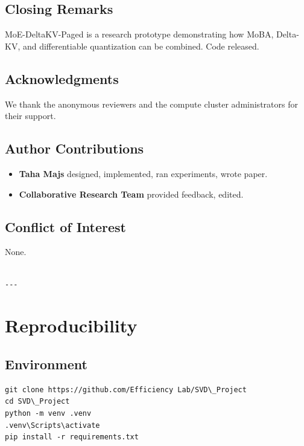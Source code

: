 \subsection{Closing Remarks}

MoE-DeltaKV-Paged is a research prototype demonstrating how MoBA, Delta-KV, 
and differentiable quantization can be combined. Code released.

\subsection{Acknowledgments}

We thank the anonymous reviewers and the compute cluster administrators for their support.

\subsection{Author Contributions}

\begin{itemize}
\item \textbf{Taha Majs} designed, implemented, ran experiments, wrote paper.
\item \textbf{Collaborative Research Team} provided feedback, edited.

\end{itemize}
\subsection{Conflict of Interest}

None.
\begin{lstlisting}

---
\end{lstlisting}

\section{Reproducibility}

\subsection{Environment}

\begin{lstlisting}
git clone https://github.com/Efficiency Lab/SVD\_Project
cd SVD\_Project
python -m venv .venv
.venv\Scripts\activate
pip install -r requirements.txt
\end{lstlisting}


